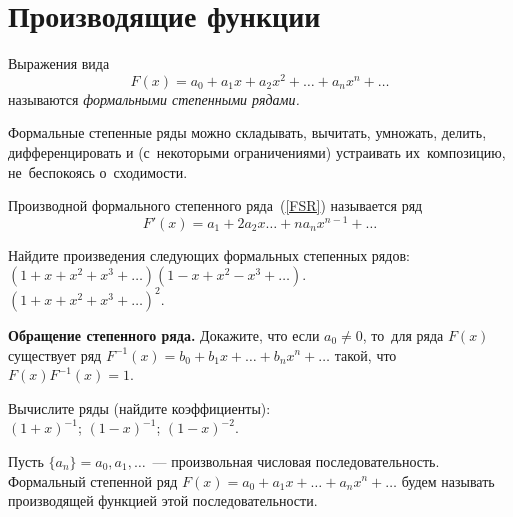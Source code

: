 

\section*{Производящие функции}


Выражения вида
\begin{equation}\label{FSR}
    F(x) = a_0 + a_1 x + a_2 x^2 + \ldots + a_n x^n + \ldots
\end{equation}
называются \emph{формальными степенными рядами.}

Формальные степенные ряды  можно складывать, вычитать, умножать, делить,
дифференцировать и (с~некоторыми ограничениями) устраивать их~композицию,
не~беспокоясь о~сходимости.

Производной формального степенного ряда~(\ref{FSR}) называется ряд
\[
    F'(x) = a_1 + 2 a_2 x \ldots + n a_n x^{n-1} + \ldots
\]

\begin{problems}

\item
Найдите произведения следующих формальных степенных рядов:
\\[0.2ex]
\sbp $(1 + x + x^2 + x^3 + \ldots) (1 - x + x^2 - x^3 + \ldots)$.
\\[0.3ex]
\sbp $(1 + x + x^2 + x^3 + \ldots)^2$.

\item\textbf{Обращение степенного ряда.}
Докажите, что если $a_0 \neq 0$, то~для ряда $F(x)$ существует ряд
$F^{-1}(x) = b_0 + b_1 x + \ldots + b_n x^n + \ldots$ такой, что
$F(x) F^{-1}(x) = 1$.

\item
Вычислите ряды (найдите коэффициенты):
\\[0.2ex]
\sbp $(1 + x)^{-1}$;
\qquad
\sbp $(1 - x)^{-1}$;
\qquad
\sbp $(1 - x)^{-2}$.

\end{problems}

Пусть $\{a_n\} = a_0, a_1, \ldots$~--- произвольная числовая
последовательность.
Формальный степенной ряд
\(
    F(x) = a_0 + a_1 x + \ldots + a_n x^n + \ldots
\)
будем называть производящей функцией этой последовательности.

